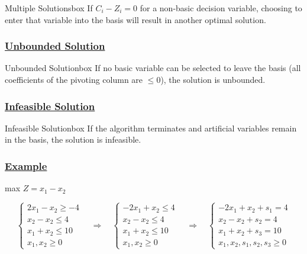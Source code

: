 \begin{prettyBox}{Multiple Solutions}{box}
If \(C_i - Z_i = 0\) for a non-basic decision variable, choosing to enter that variable into the basis will result in another optimal solution. 
\end{prettyBox}

\vspace{0.25cm}
\subsubsection*{\underline{Unbounded Solution}}

\begin{prettyBox}{Unbounded Solution}{box}
If no basic variable can be selected to leave the basis (all coefficients of the pivoting column are \(\leq 0\)), the solution is unbounded. 
\end{prettyBox}

\vspace{0.25cm}
\subsubsection*{\underline{Infeasible Solution}}

\begin{prettyBox}{Infeasible Solution}{box}
If the algorithm terminates and artificial variables remain in the basis, the solution is infeasible. 
\end{prettyBox}

\newpage
\subsubsection*{\underline{Example}}

max \(Z = x_1 - x_2\)

\[
\left\{
\begin{array}{l}
    2x_{1} - x_{2} \geq -4 \\
    x_{2}-x_{2} \leq 4 \\
    x_{1} + x_{2} \leq 10 \\
    x_{1}, x_{2}\geq 0
\end{array}
\right.
\quad
\Longrightarrow
\quad
\left\{
\begin{array}{l}
    -2x_{1} + x_{2} \leq 4 \\
    x_{2}-x_{2} \leq 4 \\
    x_{1} + x_{2} \leq 10 \\
    x_{1}, x_{2} \geq 0
\end{array}
\right.
\quad
\Longrightarrow
\quad
\left\{
\begin{array}{l}
    -2x_{1} + x_{2} + s_{1} = 4 \\
    x_{2}-x_{2} + s_{2} = 4 \\
    x_{1} + x_{2} + s_{3} = 10 \\
    x_{1}, x_{2}, s_{1}, s_{2}, s_{3}\geq 0
\end{array}
\right.
\]


